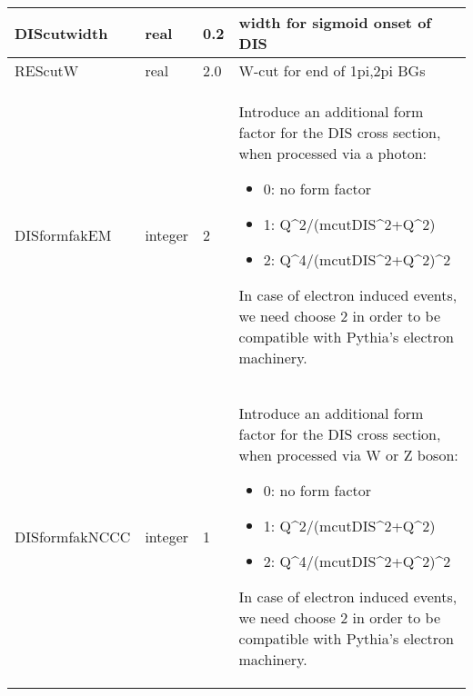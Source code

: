 \documentclass{article}
\begin{document}
\begin{longtable}{llll}
\midrule
DIScutwidth & \begin{minipage}[t]{2cm}real\end{minipage} & \begin{minipage}[t]{2cm}0.2\end{minipage} & \begin{minipage}[t]{12cm}width for sigmoid onset of DIS\end{minipage}\\*
\midrule
REScutW & \begin{minipage}[t]{2cm}real\end{minipage} & \begin{minipage}[t]{2cm}2.0\end{minipage} & \begin{minipage}[t]{12cm}W-cut for end of 1pi,2pi BGs\end{minipage}\\*
\midrule
DISformfakEM & \begin{minipage}[t]{2cm}integer\end{minipage} & \begin{minipage}[t]{2cm}2\end{minipage} & \begin{minipage}[t]{12cm}Introduce an additional form factor for the DIS cross section, when processed via a photon:\begin{itemize}\leftmargin0em\itemindent0pt\item 0: no form factor\item 1: Q\^{}2/(mcutDIS\^{}2+Q\^{}2)\item 2: Q\^{}4/(mcutDIS\^{}2+Q\^{}2)\^{}2\end{itemize} In case of electron induced events, we need choose 2 in order to be compatible with Pythia's electron machinery.\end{minipage}\\*
\midrule
DISformfakNCCC & \begin{minipage}[t]{2cm}integer\end{minipage} & \begin{minipage}[t]{2cm}1\end{minipage} & \begin{minipage}[t]{12cm}Introduce an additional form factor for the DIS cross section, when processed via W or Z boson:\begin{itemize}\leftmargin0em\itemindent0pt\item 0: no form factor\item 1: Q\^{}2/(mcutDIS\^{}2+Q\^{}2)\item 2: Q\^{}4/(mcutDIS\^{}2+Q\^{}2)\^{}2\end{itemize} In case of electron induced events, we need choose 2 in order to be compatible with Pythia's electron machinery.\end{minipage}\\*

\end{longtable}
\end{document}
